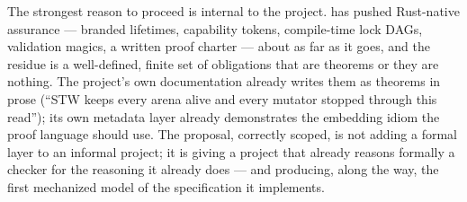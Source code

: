 \medskip

\noindent The strongest reason to proceed is internal to the
project. \dotnetrs{} has pushed Rust-native assurance --- branded
lifetimes, capability tokens, compile-time lock DAGs, validation
magics, a written proof charter --- about as far as it goes, and the
residue is a well-defined, finite set of obligations that are theorems
or they are nothing. The project's own documentation already writes
them as theorems in prose (``STW keeps every arena alive and every
mutator stopped through this read''); its own metadata layer already
demonstrates the embedding idiom the proof language should use. The
proposal, correctly scoped, is not adding a formal layer to an
informal project; it is giving a project that already reasons formally
a checker for the reasoning it already does --- and producing, along
the way, the first mechanized model of the specification it
implements.
